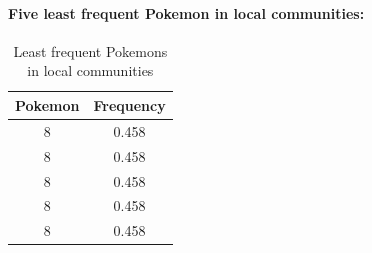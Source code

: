 \documentclass[10pt]{article}
\begin{document}
\paragraph{Five least frequent Pokemon in local communities:}

\begin{table}[H]
\centering
\begin{tabular}{|c|c|}
\hline
\multicolumn{1}{|l|}{\textbf{Pokemon}} &
  \multicolumn{1}{l|}{\textbf{Frequency}} \\ \hline
8  & 0.458 \\ \hline
8  & 0.458 \\ \hline
8  & 0.458 \\ \hline
8  & 0.458 \\ \hline
8  & 0.458 \\ \hline
\end{tabular}
\caption{Least frequent Pokemons in local communities}
\label{tab:my-table}
\end{table}
\end{document}
